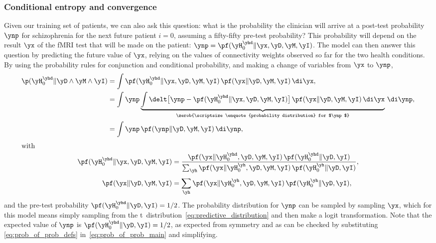 \subsubsection{Conditional entropy and convergence}

Given our training set of patients, we can also ask this question: what is
the probability the clinician will arrive at a post-test probability $\ynp$
for schizophrenia for the next future patient $i=0$, assuming a
fifty-fifty pre-test probability? This probability will depend on the
result $\yx$ of the fMRI test that will be made on the patient:
$\ynp=\pf(\yH_0^{\yhd} \| \yx,\yD, \yM, \yI)$. 
The model can then answer this
question by predicting the future value of $\yx$, relying on the values of
connectivity weights observed so far for the two health conditions. By using
the probability rules for conjunction and conditional probability, and
making a change of variables from $\yx$ to $\ynp$,
\begin{subequations}\label{eq:prob_of_prob}
  \begin{gather}
    \begin{aligned}
    \p(\yH_0^{\yhd} \| \yD\land \yM \land \yI)
    &= \int \pf(\yH_0^{\yhd} \| \yx,\yD, \yM, \yI)
      \,
      \pf(\yx \| \yD, \yM, \yI)\,\di\yx,
    \\
      &= \int \ynp \underbrace{
        \int\delt\bigl[\ynp - \pf(\yH_0^{\yhd} \| \yx,\yD, \yM, \yI)\bigr]
      \,
      \pf(\yx \| \yD, \yM, \yI)\,\di\yx}_{\zerob{\scriptsize\enquote{probability distribution} for $\ynp$}}
        \,\di\ynp,
      \\
      &=\int \ynp\, \pf(\ynp\| \yD, \yM, \yI) \,\di\ynp,
    \end{aligned}\label{eq:prob_of_prob_main}
    \\[\jot]
    \shortintertext{with}
    \begin{aligned}
    \pf(\yH_0^{\yhd} \| \yx,\yD, \yM, \yI)
    &= \frac{\pf(\yx \| \yH_0^{\yhd} ,\yD, \yM, \yI) \, \pf(\yH_0^{\yhd}\|\yD,\yI)}{
      \sum_{\yh}\pf(\yx \| \yH_0^{\yh} ,\yD, \yM, \yI) \, \pf(\yH_0^{\yh}\|\yD,\yI)},
    \\[\jot]
    \pf(\yx \| \yD, \yM, \yI)
    &= \sum_{\yh}\pf(\yx \| \yH_0^{\yh} ,\yD, \yM, \yI) \, \pf(\yH_0^{\yh}\|\yD,\yI),
    \end{aligned}\label{eq:prob_of_prob_defs}
  \end{gather}
\end{subequations}
and the pre-test probability $\pf(\yH_0^{\yhd}\|\yD,\yI)=1/2$. The
probability distribution for $\ynp$ can be sampled by sampling $\yx$, which for
this model means simply sampling from the
t~distribution~\eqref{eq:predictive_distribution} and then make a logit
transformation. Note that the expected value of $\ynp$ is
$\pf(\yH_0^{\yhd}\|\yD,\yI)=1/2$, as expected from symmetry and as can be
checked by substituting \eqref{eq:prob_of_prob_defs}
in~\eqref{eq:prob_of_prob_main} and simplifying.

